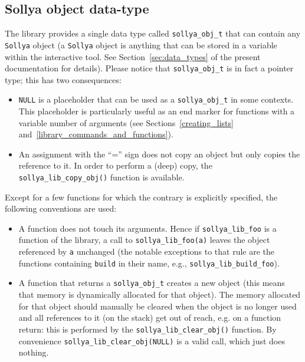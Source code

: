 \documentclass[a4paper]{article}
\newcommand{\sollya}{\texttt{Sollya}\xspace}
\begin{document}
 \subsection{Sollya object data-type}
The library provides a single data type called \texttt{sollya\_obj\_t} that can contain any \sollya object (a \sollya object is anything that can be stored in a variable within the interactive tool. See Section~\ref{sec:data_types} of the present documentation for details). Please notice that \texttt{sollya\_obj\_t} is in fact a pointer type; this has two consequences:
\begin{itemize}
\item \texttt{NULL} is a placeholder that can be used as a \texttt{sollya\_obj\_t} in some contexts. This placeholder is particularly useful as an end marker for functions with a variable number of arguments (see Sections~\ref{creating_lists} and~\ref{library_commands_and_functions}).
\item An assignment with the ``='' sign does not copy an object but only copies the reference to it. In order to perform a (deep) copy, the \texttt{sollya\_lib\_copy\_obj()} function is available.
\end{itemize}
Except for a few functions for which the contrary is explicitly specified, the following conventions are used:
\begin{itemize}
\item  A function does not touch its arguments. Hence if \texttt{sollya\_lib\_foo} is a function of the library, a call to \texttt{sollya\_lib\_foo(a)} leaves the object referenced by \texttt{a} unchanged (the notable exceptions to that rule are the functions containing \verb|build| in their name, e.g., \texttt{sollya\_lib\_build\_foo}).
\item A function that returns a \texttt{sollya\_obj\_t} creates a new object (this means that memory is dynamically allocated for that object). The memory allocated for that object should manually be cleared when the object is no longer used and all references to it (on the stack) get out of reach, e.g. on a function return: this is performed by the \texttt{sollya\_lib\_clear\_obj()} function. By convenience \verb|sollya_lib_clear_obj(NULL)| is a valid call, which just does nothing.
\end{itemize}
\end{document}
